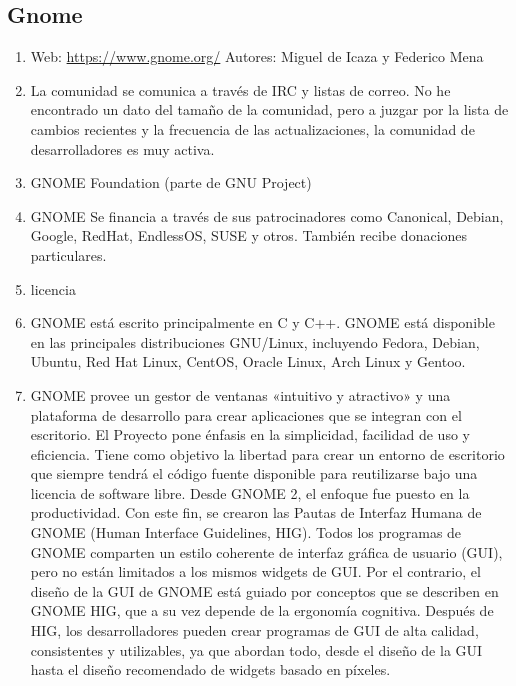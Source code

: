 \subsection{Gnome}
\begin{enumerate}
    \item Web: \url{https://www.gnome.org/} Autores:  Miguel de Icaza y Federico Mena 
    \item La comunidad se comunica a través de IRC y listas de correo. No he encontrado un dato del tamaño de la comunidad, pero a juzgar por la lista de cambios recientes y la frecuencia de las actualizaciones, la comunidad de desarrolladores es muy activa.
    \item GNOME Foundation (parte de GNU Project)
    \item GNOME Se financia a través de sus patrocinadores como Canonical, Debian, Google, RedHat, EndlessOS, SUSE y otros. También recibe donaciones particulares.
    \item licencia
    \item GNOME está escrito principalmente en C y C++. GNOME está disponible en las principales distribuciones GNU/Linux, incluyendo Fedora, Debian, Ubuntu, Red Hat Linux, CentOS, Oracle Linux, Arch Linux y Gentoo.
    \item GNOME provee un gestor de ventanas «intuitivo y atractivo» y una plataforma de desarrollo para crear aplicaciones que se integran con el escritorio. El Proyecto pone énfasis en la simplicidad, facilidad de uso y eficiencia. Tiene como objetivo la libertad para crear un entorno de escritorio que siempre tendrá el código fuente disponible para reutilizarse bajo una licencia de software libre. Desde GNOME 2, el enfoque fue puesto en la productividad. Con este fin, se crearon las Pautas de Interfaz Humana de GNOME (Human Interface Guidelines, HIG). Todos los programas de GNOME comparten un estilo coherente de interfaz gráfica de usuario (GUI), pero no están limitados a los mismos widgets de GUI. Por el contrario, el diseño de la GUI de GNOME está guiado por conceptos que se describen en GNOME HIG, que a su vez depende de la ergonomía cognitiva. Después de HIG, los desarrolladores pueden crear programas de GUI de alta calidad, consistentes y utilizables, ya que abordan todo, desde el diseño de la GUI hasta el diseño recomendado de widgets basado en píxeles.
\end{enumerate}


